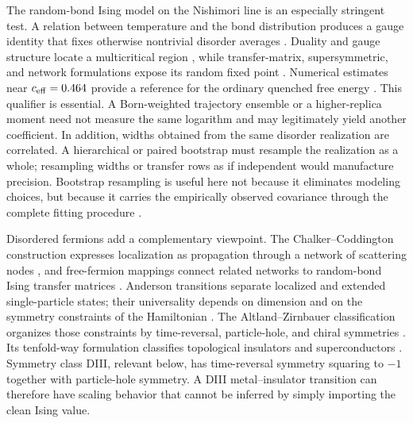 \documentclass[aps,prb,reprint,superscriptaddress,longbibliography,floatfix]{revtex4-2}
\begin{document}
The random-bond Ising model on the Nishimori line is an especially stringent
test.  A relation between temperature and the bond distribution produces a
gauge identity that fixes otherwise nontrivial disorder averages
\cite{Nishimori1981}.  Duality and gauge structure locate a multicritical
region \cite{NishimoriNemoto2002}, while transfer-matrix, supersymmetric, and
network formulations expose its random fixed point
\cite{GruzbergReadLudwig2001,MerzChalker2002}.  Numerical estimates near
$c_{\rm eff}=0.464$ provide a reference for the ordinary quenched free energy
\cite{HoneckerJacobsenPiccoPujol2001}.  This qualifier is essential.  A
Born-weighted trajectory ensemble or a higher-replica moment need not measure
the same logarithm and may legitimately yield another coefficient.  In
addition, widths obtained from the same disorder realization are correlated.
A hierarchical or paired bootstrap must resample the realization as a whole;
resampling widths or transfer rows as if independent would manufacture
precision.  Bootstrap resampling is useful here not because it eliminates
modeling choices, but because it carries the empirically observed covariance
through the complete fitting procedure \cite{EfronTibshirani1993}.

Disordered fermions add a complementary viewpoint.  The
Chalker--Coddington construction expresses localization as propagation
through a network of scattering nodes \cite{ChalkerCoddington1988}, and
free-fermion mappings connect related networks to random-bond Ising transfer
matrices \cite{ChoFisher1997,MerzChalker2002}.  Anderson transitions separate
localized and extended single-particle states; their universality depends on
dimension and on the symmetry constraints of the Hamiltonian
\cite{EversMirlin2008}.  The Altland--Zirnbauer classification organizes
those constraints by time-reversal, particle-hole, and chiral symmetries
\cite{AltlandZirnbauer1997}.  Its tenfold-way formulation classifies
topological insulators and superconductors
\cite{SchnyderRyuFurusakiLudwig2008,RyuSchnyderFurusakiLudwig2010,
Kitaev2009}.  Symmetry class DIII, relevant below, has time-reversal symmetry
squaring to $-1$ together with particle-hole symmetry.  A DIII
metal--insulator transition can therefore have scaling behavior that cannot
be inferred by simply importing the clean Ising value.
\end{document}
